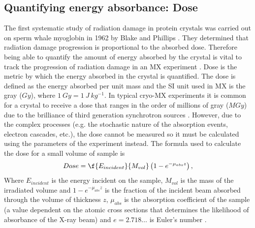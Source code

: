     \subsection{Quantifying energy absorbance: Dose}
    \label{sub:Quantifying energy absorbance: Dose}
        The first systematic study of radiation damage in protein crystals was carried out on sperm whale myoglobin in 1962 by Blake and Phillips \cite{blake1962}.
        They determined that radiation damage progression is proportional to the absorbed dose.
        Therefore being able to quantify the amount of energy absorbed by the crystal is vital to track the progression of radiation damage in an MX experiment \cite{blake1962,holton2009}.
        Dose is the metric by which the energy absorbed in the crystal is quantified.
        The dose is defined as the energy absorbed per unit mass and the SI unit used in MX is the gray ($Gy$), where $1\ Gy = 1\ J\ kg^{-1}$.
        In typical cryo-MX experiments it is common for a crystal to receive a dose that ranges in the order of millions of gray ($MGy$) \cite{garman2010} due to the brilliance of third generation synchrotron sources \cite{mitchell1999}.
        However, due to the complex processes (e.g. the stochastic nature of the absorption events, electron cascades, etc.), the dose cannot be measured so it must be calculated using the parameters of the experiment instead.
        The formula used to calculate the dose for a small volume of sample is
        \begin{equation}
            Dose = \f{E_{incident}}{M_{vol}} \left(1- e^{-\mu_{abs}z}\right),
            \label{eq:Dose Calculation 1D}
        \end{equation}
        Where $E_{incident}$ is the energy incident on the sample, $M_{vol}$ is the mass of the irradiated volume and $1- e^{-\mu_{abs}z}$ is the fraction of the incident beam absorbed through the volume of thickness $z$, $\mu_{abs}$ is the absorption coefficient of the sample (a value dependent on the atomic cross sections that determines the likelihood of absorbance of the X-ray beam) and $e = 2.718 \ldots$ is Euler's number \cite{zeldin2013thesis}.

